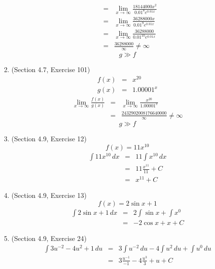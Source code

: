 \documentclass{article}
\begin{document}
\begin{enumerate}
\begin{eqnarray}
                                                   &=& \lim_{x \to \infty}{\frac{18144000x^2}{0.01^8e^{0.01x}}} \\
                                                   &=& \lim_{x \to \infty}{\frac{36288000x}{0.01^9e^{0.01x}}} \\
                                                   &=& \lim_{x \to \infty}{\frac{36288000}{0.01^{10}e^{0.01x}}} \\
                                                   &=& \frac{36288000}{\infty} \neq \infty
        \end{eqnarray}
        $$g \gg f$$
    \item (Section 4.7, Exercise 101)
        \begin{eqnarray}
            f(x) &=& x^{20} \\
            g(x) &=& 1.00001^x
        \end{eqnarray}
        \begin{eqnarray}
            \lim_{x \to \infty}{\frac{f(x)}{g(x)}} &=& \lim_{x \to \infty}{\frac{x^{20}}{1.00001^x}} \\
                                                   &=& \frac{2432902008176640000}{\infty} \neq \infty
        \end{eqnarray}
        $$g \gg f$$
    \item (Section 4.9, Exercise 12)
        $$f(x) = 11x^{10}$$
        \begin{eqnarray}
            \int{11x^{10}}\,dx &=& 11\int{x^{10}}\,dx \\
                               &=& 11\frac{x^{11}}{11} + C \\
                               &=& x^{11} + C
        \end{eqnarray}
    \item (Section 4.9, Exercise 13)
        $$f(x) = 2\sin{x} + 1$$
        \begin{eqnarray}
            \int{2\sin{x} + 1}\,dx &=& 2\int{\sin{x}} + \int{x^0} \\
                                   &=& -2\cos{x} + x + C
        \end{eqnarray}
    \item (Section 4.9, Exercise 24)
        \begin{eqnarray}
            \int{3u^{-2} - 4u^2 + 1}\,du &=& 3\int{u^{-2}}\,du - 4\int{u^2}\,du + \int{u^0}\,du \\
                                         &=& 3\frac{u^{-1}}{-1} - 4\frac{u^3}{3} + u + C \\

\end{eqnarray}
\end{enumerate}
\end{document}
